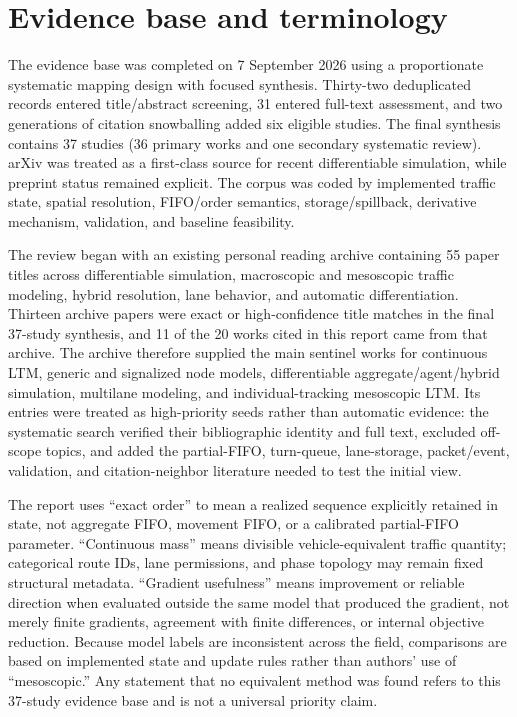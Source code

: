 \documentclass[11pt,a4paper]{article}
\begin{document}
\section{Evidence base and terminology}

The evidence base was completed on 7 September 2026 using a proportionate systematic mapping design with focused synthesis. Thirty-two deduplicated records entered title/abstract screening, 31 entered full-text assessment, and two generations of citation snowballing added six eligible studies. The final synthesis contains 37 studies (36 primary works and one secondary systematic review). arXiv was treated as a first-class source for recent differentiable simulation, while preprint status remained explicit. The corpus was coded by implemented traffic state, spatial resolution, FIFO/order semantics, storage/spillback, derivative mechanism, validation, and baseline feasibility.

The review began with an existing personal reading archive containing 55 paper titles across differentiable simulation, macroscopic and mesoscopic traffic modeling, hybrid resolution, lane behavior, and automatic differentiation. Thirteen archive papers were exact or high-confidence title matches in the final 37-study synthesis, and 11 of the 20 works cited in this report came from that archive. The archive therefore supplied the main sentinel works for continuous LTM, generic and signalized node models, differentiable aggregate/agent/hybrid simulation, multilane modeling, and individual-tracking mesoscopic LTM. Its entries were treated as high-priority seeds rather than automatic evidence: the systematic search verified their bibliographic identity and full text, excluded off-scope topics, and added the partial-FIFO, turn-queue, lane-storage, packet/event, validation, and citation-neighbor literature needed to test the initial view.

The report uses ``exact order'' to mean a realized sequence explicitly retained in state, not aggregate FIFO, movement FIFO, or a calibrated partial-FIFO parameter. ``Continuous mass'' means divisible vehicle-equivalent traffic quantity; categorical route IDs, lane permissions, and phase topology may remain fixed structural metadata. ``Gradient usefulness'' means improvement or reliable direction when evaluated outside the same model that produced the gradient, not merely finite gradients, agreement with finite differences, or internal objective reduction. Because model labels are inconsistent across the field, comparisons are based on implemented state and update rules rather than authors' use of ``mesoscopic.'' Any statement that no equivalent method was found refers to this 37-study evidence base and is not a universal priority claim.
\end{document}
